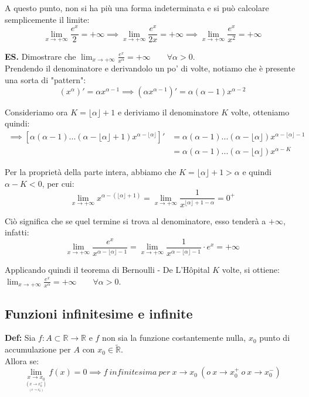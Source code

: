 \documentclass{article}
\begin{document}
\noindent A questo punto, non si ha più una forma indeterminata e si può calcolare semplicemente il limite:
\begin{equation*}
    \lim_{x \to +\infty} \frac{e^x}{2} = +\infty \implies \lim_{x \to +\infty} \frac{e^x}{2x} = +\infty \implies \lim_{x \to +\infty} \frac{e^x}{x^2} = +\infty
\end{equation*}

\noindent\textbf{ES.} Dimostrare che $\lim_{x \to +\infty} \frac{e^x}{x^\alpha} = +\infty \qquad \forall \alpha > 0$.\\
Prendendo il denominatore e derivandolo un po' di volte, notiamo che è presente una sorta di "pattern":
\begin{equation*}
    (x^\alpha)' = \alpha x^{\alpha-1} \implies (\alpha x^{\alpha-1})' = \alpha(\alpha - 1) x^{\alpha-2} 
\end{equation*}

\noindent Consideriamo ora $K = \lfloor \alpha \rfloor + 1$ e deriviamo il denominatore $K$ volte, otteniamo quindi:
\begin{align*}
    \implies [\alpha(\alpha - 1)...(\alpha - \lfloor\alpha\rfloor + 1)x^{\alpha - \lfloor\alpha\rfloor}]' &= \alpha(\alpha - 1)...(\alpha - \lfloor\alpha\rfloor)x^{\alpha - \lfloor\alpha\rfloor - 1}\\
    &= \alpha(\alpha - 1)...(\alpha - \lfloor\alpha\rfloor)x^{\alpha - K}
\end{align*}

\noindent Per la proprietà della parte intera, abbiamo che $K = \lfloor \alpha\rfloor + 1 > \alpha$ e quindi $\alpha - K < 0$, per cui:
\begin{equation*}
    \lim_{x \to +\infty} x^{\alpha - (\lfloor\alpha\rfloor + 1)} = \lim_{x \to +\infty} \frac{1}{x^{\lfloor\alpha\rfloor + 1 - \alpha}} = 0^+
\end{equation*}

\noindent Ciò significa che se quel termine si trova al denominatore, esso tenderà a $+\infty$, infatti:
\begin{equation*}
    \lim_{x \to +\infty} \frac{e^x}{x^{\alpha - \lfloor\alpha\rfloor-1}} = \lim_{x \to +\infty} \frac{1}{x^{\alpha - \lfloor\alpha\rfloor-1}} \cdot e^x = +\infty
\end{equation*}

\noindent Applicando quindi il teorema di Bernoulli - De L'Hôpital $K$ volte, si ottiene: $\lim_{x \to +\infty} \frac{e^x}{x^\alpha} = +\infty \qquad \forall \alpha > 0$.

\subsection{Funzioni infinitesime e infinite}
\textbf{Def:} Sia $f: A \subset \mathbb{R} \xrightarrow{} \mathbb{R}$ e $f$ non sia la funzione costantemente nulla, $x_0$ punto di accumulazione per $A$ con $x_0 \in \widetilde{\mathbb{R}}$. \\
Allora se:
\begin{equation*}
    \lim_{\underset{\underset{\scriptstyle (x \to x_0^-)}{\scriptstyle (x \to x_0^+)}}{x \to x_0}} f(x) = 0 \implies f \ infinitesima \ per \ x \to x_0 \ (o \ x \to x_0^+ \ o \ x \to x_0^-)
\end{equation*}
\end{document}
